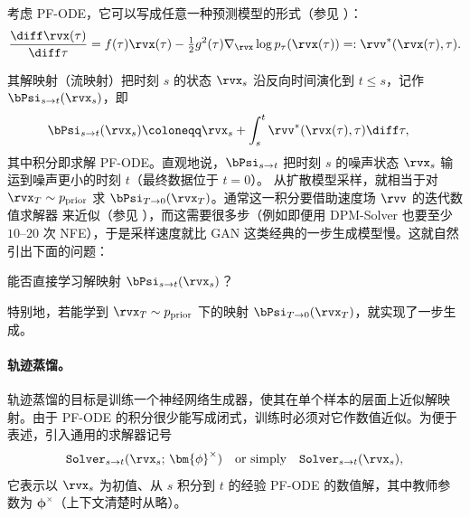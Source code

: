 考虑 PF-ODE，它可以写成任意一种预测模型的形式（参见 ）：
\begin{align}\label{eq:pf-ode-ct}
    \frac{\diff \rvx(\tau)}{\diff \tau}
    = f(\tau) \rvx(\tau) - \tfrac{1}{2}g^2(\tau) \nabla_\rvx \log p_\tau(\rvx(\tau))
    =: \rvv^*(\rvx(\tau), \tau).
\end{align}

其解映射（流映射）把时刻 $s$ 的状态 $\rvx_s$ 沿反向时间演化到
$t \leq s$，记作 $\bPsi_{s\to t}(\rvx_s)$，即
\begin{align}\label{eq:int_target_gt}
\begin{aligned}
    \bPsi_{s\to t}(\rvx_s)
    &\coloneqq \rvx_s + \int_s^t \rvv^*(\rvx(\tau), \tau) \diff \tau,
\end{aligned}
\end{align}
其中积分即求解 PF-ODE。直观地说，$\bPsi_{s\to t}$ 把时刻 $s$ 的噪声状态
$\rvx_s$ 输运到噪声更小的时刻 $t$（最终数据位于 $t=0$）。
从扩散模型采样，就相当于对 $\rvx_T \sim p_{\mathrm{prior}}$ 求
$\bPsi_{T\to 0}(\rvx_T)$。通常这一积分要借助速度场 $\rvv$ 的迭代数值求解器
来近似（参见 ），而这需要很多步（例如即便用
DPM-Solver 也要至少 $10$–$20$ 次 NFE），于是采样速度就比 GAN 这类经典的一步生成模型慢。这就自然引出下面的问题：
\begin{question}
    能否直接学习解映射 $\bPsi_{s\to t}(\rvx_s)$？
\end{question}
特别地，若能学到 $\rvx_T \sim p_{\mathrm{prior}}$ 下的映射
$\bPsi_{T\to 0}(\rvx_T)$，就实现了一步生成。


\paragraph{轨迹蒸馏。}

轨迹蒸馏的目标是训练一个神经网络生成器，使其在单个样本的层面上近似解映射。由于 PF-ODE 的积分很少能写成闭式，训练时必须对它作数值近似。为便于表述，引入通用的求解器记号
\begin{align}\label{eq:solver}
    \mathtt{Solver}_{s\to t}(\rvx_s;\,\bm{\phi}^\times)
    \quad \text{or simply} \quad
    \mathtt{Solver}_{s\to t}(\rvx_s),
\end{align}
它表示以 $\rvx_s$ 为初值、从 $s$ 积分到 $t$ 的经验 PF-ODE 的数值解，其中教师参数为 $\bm{\phi}^\times$（上下文清楚时从略）。


